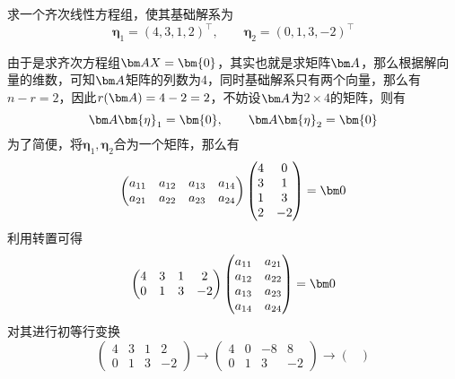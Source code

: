 \begin{example}
    求一个齐次线性方程组，使其基础解系为
    \[ \bm{\eta}_1 = (4,3,1,2)^\intercal,\qquad \bm{\eta}_2 = (0,1,3,-2)^\intercal \]
\end{example}
\begin{solution}
    由于是求齐次方程组$\mat{AX}=\bm{0}$，其实也就是求矩阵$\mat{A}$，那么根据解向量的维数，可知$\mat{A}$矩阵的列数为$4$，同时基础解系只有两个向量，那么有
    $n-r=2$，因此$r(\mat{A}) = 4-2 = 2$，不妨设$\mat{A}$为$2\times 4$的矩阵，则有
    \[ \mat{A}\bm{\eta}_1 = \bm{0}, \qquad \mat{A}\bm{\eta}_2 = \bm{0} \]
    为了简便，将$\bm{\eta}_1,\bm{\eta}_2$合为一个矩阵，那么有
    \[
        \begin{pmatrix}
            a_{11} & a_{12} & a_{13} & a_{14} \\
            a_{21} & a_{22} & a_{23} & a_{24} \\
        \end{pmatrix}
        \begin{pmatrix}
            4 & 0  \\
            3 & 1  \\
            1 & 3  \\
            2 & -2
        \end{pmatrix}
        =\mat{0}
    \]
    利用转置可得
    \[
        \begin{pmatrix}
            4 & 3 & 1 & 2  \\
            0 & 1 & 3 & -2
        \end{pmatrix}
        \begin{pmatrix}
            a_{11} & a_{21} \\
            a_{12} & a_{22} \\
            a_{13} & a_{23} \\
            a_{14} & a_{24} \\
        \end{pmatrix}
        =\mat{0}
    \]
    对其进行初等行变换
    \[
        \begin{pmatrix}
            4 & 3 & 1 & 2  \\
            0 & 1 & 3 & -2
        \end{pmatrix}
        \longrightarrow
        \begin{pmatrix}
            4 & 0 & -8 & 8  \\
            0 & 1 & 3  & -2
        \end{pmatrix}
        \longrightarrow
        \begin{pmatrix}

\end{pmatrix}\]
\end{solution}
